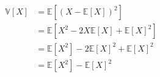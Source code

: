 \documentclass[preview]{standalone}
\begin{document}
\begin{align*}
\mathbb{V}[X] &= \mathbb{E}\left[\left(X - \mathbb{E}[X]\right)^2\right]\\&=\mathbb{E}\left[X^2-2X\mathbb{E}[X] + \mathbb{E}[X]^2\right]\\&= \mathbb{E}[X^2] - 2\mathbb{E}[X]^2 + \mathbb{E}[X]^2\\&= \mathbb{E}[X^2] - \mathbb{E}[X]^2
\end{align*}
\end{document}
